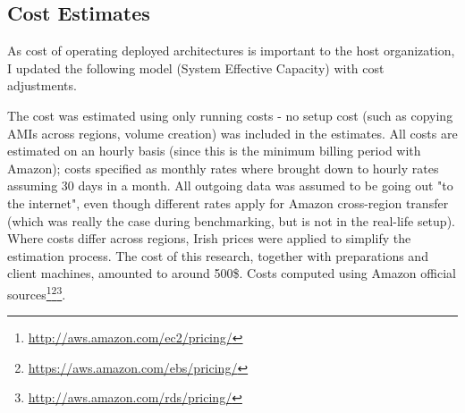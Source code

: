 \documentclass{uvamscse}
\begin{document}
\subsection{Cost Estimates}

As cost of operating deployed architectures is important to the host organization, I updated the following model (System Effective Capacity) with cost adjustments.

The cost was estimated using only running costs - no setup cost (such as copying AMIs across regions, volume creation) was included in the estimates. All costs are estimated on an hourly basis (since this is the minimum billing period with Amazon); costs specified as monthly rates where brought down to hourly rates assuming 30 days in a month. All outgoing data was assumed to be going out "to the internet", even though different rates apply for Amazon cross-region transfer (which was really the case during benchmarking, but is not in the real-life setup). Where costs differ across regions, Irish prices were applied to simplify the estimation process. The cost of this research, together with preparations and client machines, amounted to around 500\$. Costs computed using Amazon official sources\footnote{\url{http://aws.amazon.com/ec2/pricing/}}\footnote{\url{https://aws.amazon.com/ebs/pricing/}}\footnote{\url{http://aws.amazon.com/rds/pricing/}}.
\end{document}

